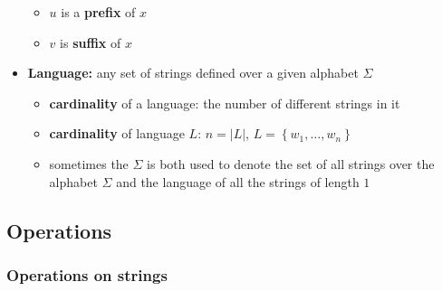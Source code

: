 \documentclass[english]{article}
\begin{document}
\begin{itemize}
\begin{itemize}
          \item \(u\) is a \textbf{prefix} of \(x\)
          \item \(v\) is \textbf{suffix} of \(x\)
        \end{itemize}
  \item \textbf{Language:} any set of strings defined over a given alphabet \(\Sigma\)
        \begin{itemize}
          \item \textbf{cardinality} of a language: the number of different strings in it
          \item \textbf{cardinality} of language \(L\): \(n = \left| L \right|\), \(L =  \left\{ w_1, \ldots, w_n \right\}\)
          \item sometimes the \(\Sigma\) is both used to denote the set of all strings over the alphabet \(\Sigma\) and the language of all the strings of length \(1\)
        \end{itemize}
\end{itemize}

\subsection{Operations}

\subsubsection{Operations on strings}
\end{document}
